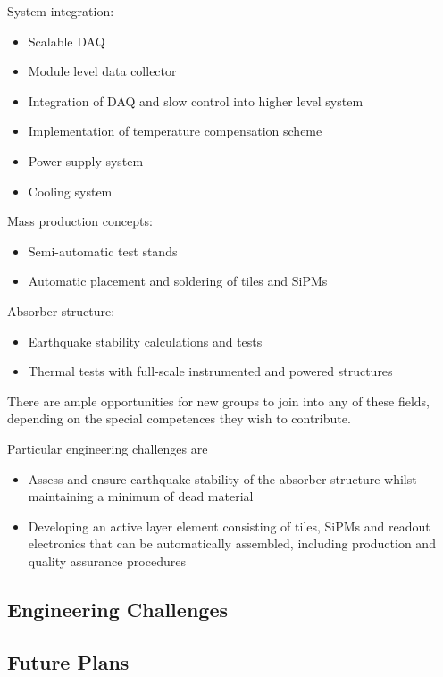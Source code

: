 System integration:
\begin{itemize}
\item Scalable DAQ
\item Module level data collector
\item Integration of DAQ and slow control into higher level system
\item Implementation of temperature compensation scheme
\item Power supply system
\item Cooling system
\end{itemize}

Mass production concepts:
\begin{itemize}
\item Semi-automatic test stands
\item Automatic placement and soldering of tiles and SiPMs
\end{itemize}

Absorber structure:
\begin{itemize}
\item Earthquake stability calculations and tests
\item Thermal tests with full-scale instrumented and powered structures  
\end{itemize}

There are ample opportunities for new groups to join into any of these fields, depending on the special competences they wish to contribute. 

Particular engineering challenges are
\begin{itemize}
\item Assess and ensure earthquake stability of the absorber structure whilst maintaining a minimum of dead material
\item Developing an active layer element consisting of tiles, SiPMs and readout electronics that can be automatically assembled, including production and quality assurance procedures
\end{itemize}

\subsection{Engineering Challenges}
\subsection{Future Plans}